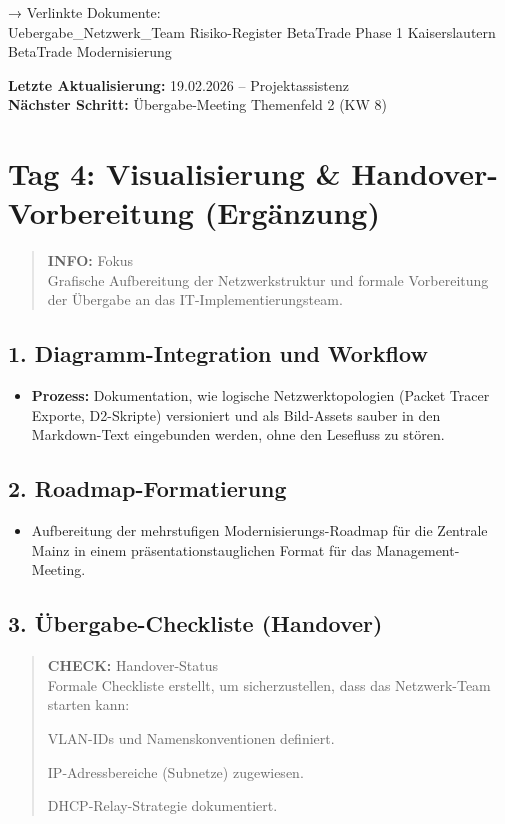 \documentclass[
]{article}
\providecommand{\tightlist}{%
  \setlength{\itemsep}{0pt}\setlength{\parskip}{0pt}}
\begin{document}
→ Verlinkte Dokumente:\\
Uebergabe\_Netzwerk\_Team \textbar{} Risiko-Register BetaTrade
\textbar{} Phase 1 Kaiserslautern \textbar{} BetaTrade Modernisierung

\textbf{Letzte Aktualisierung:} 19.02.2026 -- Projektassistenz\\
\textbf{Nächster Schritt:} Übergabe-Meeting Themenfeld 2 (KW 8)

\section{Tag 4: Visualisierung \& Handover-Vorbereitung
(Ergänzung)}\label{tag-4-visualisierung-handover-vorbereitung-erguxe4nzung}

\begin{quote}
\textbf{INFO:} Fokus\\
Grafische Aufbereitung der Netzwerkstruktur und formale Vorbereitung der
Übergabe an das IT-Implementierungsteam.
\end{quote}

\subsection{1. Diagramm-Integration und
Workflow}\label{diagramm-integration-und-workflow}

\begin{itemize}
\tightlist
\item
  \textbf{Prozess:} Dokumentation, wie logische Netzwerktopologien
  (Packet Tracer Exporte, D2-Skripte) versioniert und als Bild-Assets
  sauber in den Markdown-Text eingebunden werden, ohne den Lesefluss zu
  stören.
\end{itemize}

\subsection{2. Roadmap-Formatierung}\label{roadmap-formatierung}

\begin{itemize}
\tightlist
\item
  Aufbereitung der mehrstufigen Modernisierungs-Roadmap für die Zentrale
  Mainz in einem präsentationstauglichen Format für das
  Management-Meeting.
\end{itemize}

\subsection{3. Übergabe-Checkliste
(Handover)}\label{uxfcbergabe-checkliste-handover}

\begin{quote}
\textbf{CHECK:} Handover-Status\\
Formale Checkliste erstellt, um sicherzustellen, dass das Netzwerk-Team
starten kann:

VLAN-IDs und Namenskonventionen definiert.

IP-Adressbereiche (Subnetze) zugewiesen.

DHCP-Relay-Strategie dokumentiert.
\end{quote}
\end{document}
